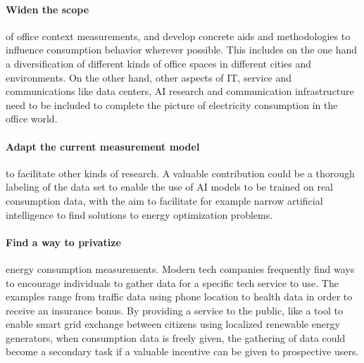 \paragraph{Widen the scope}of office context measurements, and develop concrete aids and methodologies to influence consumption behavior wherever possible. This includes on the one hand a diversification of different kinds of office spaces in different cities and environments. On the other hand, other aspects of IT, service and communications like data centers, AI research and communication infrastructure need to be included to complete the picture of electricity consumption in the office world.
\paragraph{Adapt the current measurement model} to facilitate other kinds of research. A valuable contribution could be a thorough labeling of the data set to enable the use of AI models to be trained on real consumption data, with the aim to facilitate for example narrow artificial intelligence to find solutions to energy optimization problems.
\paragraph{Find a way to privatize}energy consumption measurements. Modern tech companies frequently find ways to encourage individuals to gather data for a specific tech service to use. The examples range from traffic data using phone location to health data in order to receive an insurance bonus. By providing a service to the public, like a tool to enable smart grid exchange between citizens using localized renewable energy generators, when consumption data is freely given, the gathering of data could become a secondary task if a valuable incentive can be given to prospective users. 